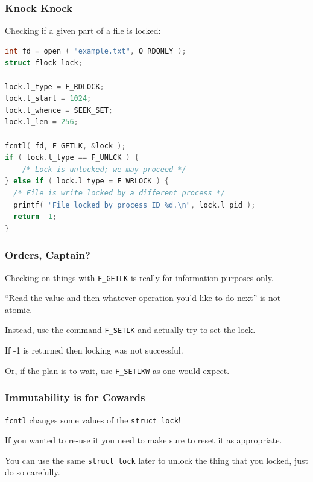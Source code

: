 \begin{frame}[fragile]
	\frametitle{Knock Knock}

	Checking if a given part of a file is locked:


	\begin{lstlisting}[language=C]
int fd = open ( "example.txt", O_RDONLY );
struct flock lock;

lock.l_type = F_RDLOCK;
lock.l_start = 1024;
lock.l_whence = SEEK_SET;
lock.l_len = 256;

fcntl( fd, F_GETLK, &lock );
if ( lock.l_type == F_UNLCK ) {
	/* Lock is unlocked; we may proceed */
} else if ( lock.l_type = F_WRLOCK ) {
  /* File is write locked by a different process */
  printf( "File locked by process ID %d.\n", lock.l_pid );
  return -1;
}
\end{lstlisting}

\end{frame}

\begin{frame}
	\frametitle{Orders, Captain?}

	Checking on things with \texttt{F\_GETLK} is really for information purposes only.

	``Read the value and then whatever operation you'd like to do next'' is not
	atomic.

	Instead, use the command \texttt{F\_SETLK} and actually try to set the lock.

	If -1 is returned then locking was not successful.

	Or, if the plan is to wait, use \texttt{F\_SETLKW} as one would expect.

\end{frame}


\begin{frame}
	\frametitle{Immutability is for Cowards}

	\texttt{fcntl} changes some values of the \texttt{struct lock}!

	If you wanted to re-use it you need to make sure to reset it as appropriate.

	You can use the same \texttt{struct lock} later to unlock the thing that you locked, just do so carefully.

\end{frame}


